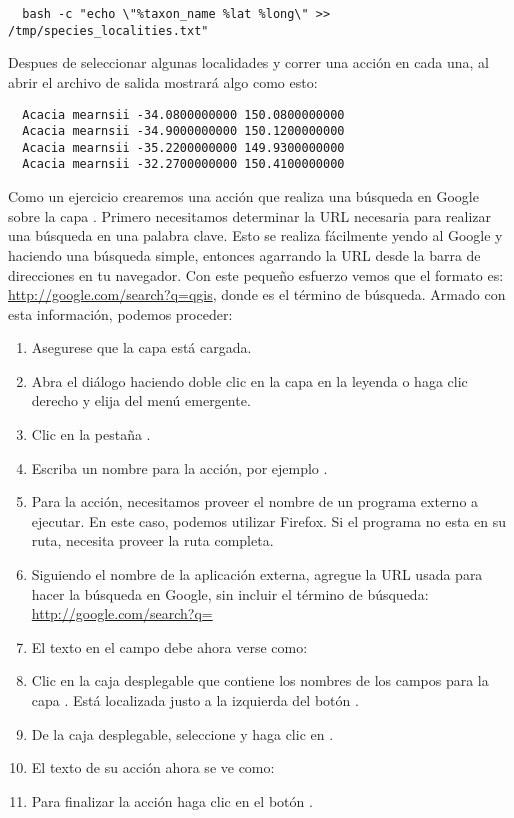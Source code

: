 \begin{verbatim}
  bash -c "echo \"%taxon_name %lat %long\" >> /tmp/species_localities.txt"
\end{verbatim} 

Despues de seleccionar algunas localidades y correr una acci\'on en cada una, al abrir
el archivo de salida mostrar\'a algo como esto:

\begin{verbatim}
  Acacia mearnsii -34.0800000000 150.0800000000
  Acacia mearnsii -34.9000000000 150.1200000000
  Acacia mearnsii -35.2200000000 149.9300000000
  Acacia mearnsii -32.2700000000 150.4100000000
\end{verbatim} 

Como un ejercicio crearemos una acci\'on que realiza una b\'usqueda en Google sobre la capa 
. Primero necesitamos determinar la URL necesaria para realizar una b\'usqueda en una
palabra clave. Esto se realiza f\'acilmente yendo al Google y haciendo una b\'usqueda
simple, entonces agarrando la URL desde la barra de direcciones en tu navegador. Con este
peque\~no esfuerzo vemos que el formato es: \url{http://google.com/search?q=qgis},
donde  es el t\'ermino de b\'usqueda. Armado con esta informaci\'on, podemos
proceder:

\begin{enumerate}
\item Asegurese que la capa  est\'a cargada.
\item Abra el di\'alogo  haciendo doble clic en la capa en la
  leyenda o haga clic derecho y elija  del men\'u emergente.
\item Clic en la pesta\~na .
\item Escriba un nombre para la acci\'on, por ejemplo .
\item Para la acci\'on, necesitamos proveer el nombre de un programa externo a
  ejecutar. En este caso, podemos utilizar Firefox. Si el programa no esta en
  su ruta, necesita proveer la ruta completa.
\item Siguiendo el nombre de la aplicaci\'on externa, agregue la URL usada para
  hacer la b\'usqueda en Google, sin incluir el t\'ermino de b\'usqueda:
  \url{http://google.com/search?q=}
\item El texto en el campo  debe ahora verse como:\\
\item Clic en la caja desplegable que contiene los nombres de los campos para la
  capa . Est\'a localizada justo a la izquierda del
  bot\'on .
\item De la caja desplegable, seleccione  y haga clic en .
\item El texto de su acci\'on ahora se ve como:\\ 
\item Para finalizar la acci\'on haga clic en el bot\'on .
\end{enumerate}
 
